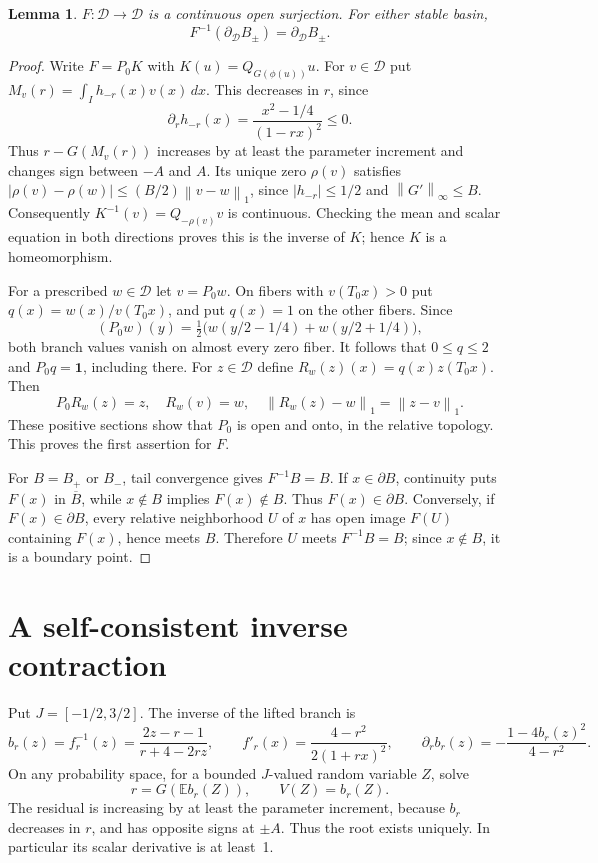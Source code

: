\documentclass[11pt]{article}
\newtheorem{lemma}[theorem]{Lemma}
\newcommand{\D}{\mathcal D}
\newcommand{\E}{\mathbb E}
\newcommand{\norm}[1]{\left\lVert#1\right\rVert}
\newcommand{\one}{\mathbf 1}
\begin{document}
\begin{lemma}\label{lem:open}
$F:\D\to\D$ is a continuous open surjection. For either stable basin,
\[
 F^{-1}(\partial_\D B_\pm)=\partial_\D B_\pm.
\]
\end{lemma}
\begin{proof}
Write $F=P_0K$ with $K(u)=Q_{G(\phi(u))}u$. For $v\in\D$ put
$M_v(r)=\int_I h_{-r}(x)v(x)\,dx$. This decreases in $r$, since
\[
 \partial_r h_{-r}(x)=\frac{x^2-1/4}{(1-rx)^2}\le0.
\]
Thus $r-G(M_v(r))$ increases by at least the parameter increment and changes
sign between $-A$ and $A$. Its unique zero $\rho(v)$ satisfies
$|\rho(v)-\rho(w)|\le(B/2)\norm{v-w}_1$, since $|h_{-r}|\le1/2$ and
$\norm{G'}_\infty\le B$. Consequently
$K^{-1}(v)=Q_{-\rho(v)}v$ is continuous. Checking the mean and scalar equation
in both directions proves this is the inverse of $K$; hence $K$ is a
homeomorphism.

For a prescribed $w\in\D$ let $v=P_0w$. On fibers with $v(T_0x)>0$ put
$q(x)=w(x)/v(T_0x)$, and put $q(x)=1$ on the other fibers. Since
\[
 (P_0w)(y)=\tfrac12\bigl(w(y/2-1/4)+w(y/2+1/4)\bigr),
\]
both branch values vanish on almost every zero fiber. It follows that
$0\le q\le2$ and $P_0q=\one$, including there. For $z\in\D$ define
$R_w(z)(x)=q(x)z(T_0x)$. Then
\[
 P_0R_w(z)=z,\quad R_w(v)=w,\quad
 \norm{R_w(z)-w}_1=\norm{z-v}_1.
\]
These positive sections show that $P_0$ is open and onto, in the relative
topology. This proves the first assertion for $F$.

For $B=B_+$ or $B_-$, tail convergence gives $F^{-1}B=B$.
If $x\in\partial B$, continuity puts $F(x)$ in $\overline B$, while
$x\notin B$ implies $F(x)\notin B$. Thus $F(x)\in\partial B$.
Conversely, if $F(x)\in\partial B$, every relative neighborhood $U$ of $x$
has open image $F(U)$ containing $F(x)$, hence meets $B$. Therefore $U$
meets $F^{-1}B=B$; since $x\notin B$, it is a boundary point.
\end{proof}

\section{A self-consistent inverse contraction}
Put $J=[-1/2,3/2]$. The inverse of the lifted branch is
\[
 b_r(z)=f_r^{-1}(z)=\frac{2z-r-1}{r+4-2rz},\qquad
 f'_r(x)=\frac{4-r^2}{2(1+rx)^2},\qquad
 \partial_r b_r(z)=-\frac{1-4b_r(z)^2}{4-r^2}.
\]
On any probability space, for a bounded $J$-valued random variable $Z$, solve
\[
 r=G(\E b_r(Z)),\qquad V(Z)=b_r(Z).                 \tag{1}\label{eq:V}
\]
The residual is increasing by at least the parameter increment, because
$b_r$ decreases in $r$, and has opposite signs at $\pm A$. Thus the root
exists uniquely. In particular its scalar derivative is at least~1.
\end{document}
